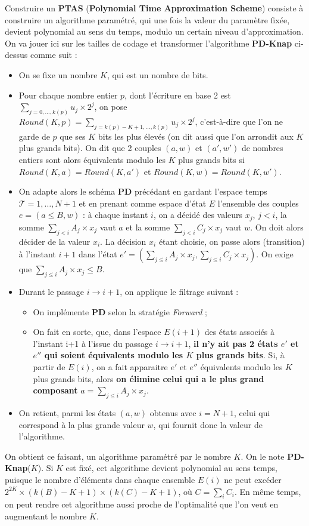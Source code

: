 Construire un \textbf{PTAS} (\textbf{Polynomial Time Approximation Scheme}) consiste à construire un algorithme paramétré, qui une fois la valeur du paramètre fixée, devient polynomial au sens du temps, modulo un certain niveau d'approximation. On va jouer ici sur les tailles de codage et transformer l'algorithme \textbf{PD-Knap} ci-dessus comme suit :

\begin{itemize}[label=$\square$]
	\item	On se fixe un nombre $K$, qui est un nombre de bits.
	\item	Pour chaque nombre entier $p$, dont l'écriture en base 2 est $\sum_{j = 0,\dots,k(p)} u_j\times 2^j$, on pose $Round(K, p) = \sum_{j = k(p) - K+1 ,\dots,k(p)} u_j \times 2^j$,  c'est-à-dire que l'on ne garde de $p$ que ses $K$ bits les plus élevés (on dit aussi que l'on arrondit aux $K$ plus grands bits). On dit que 2 couples $(a, w)$ et $(a', w')$ de nombres entiers sont alors équivalents modulo les $K$ plus grands bits si $Round(K, a) = Round(K, a')$ et $Round(K, w) = Round(K, w')$.
	\item	On adapte alors le schéma \textbf{PD} précédant en gardant l'espace temps $\mathcal{T} = {1, \dots, N+1}$ et en prenant comme espace d'état $E$ l'ensemble des couples $e = (a \leq B, w)$ : à chaque instant $i$, on a décidé des valeurs $x_j$, $j < i$, la somme $\sum_{j < i } A_j\times x_j$ vaut $a$ et la somme $\sum_{j < i} C_j\times x_j$ vaut $w$.  On doit alors décider de la valeur $x_i$. La décision $x_i$ étant choisie, on passe alors (transition) à l'instant $i+1$ dans l'état $e' = (\sum_{j \leq i} A_j \times x_j, \sum_{j \leq i} C_j\times x_j)$. On exige que $\sum_{j \leq i} A_j\times x_j \leq B$.
	\item	Durant le passage $i \rightarrow i+1$, on applique le filtrage suivant : 
	\begin{itemize}
		\item	On implémente \textbf{PD} selon la stratégie \textit{Forward} ;
		\item	On fait en sorte, que, dans l'espace $E(i+1)$ des états associés à l'instant i+1 à l'issue du passage $i \rightarrow i+1$, \textbf{il n'y ait pas 2 états $e'$ et $e''$ qui soient équivalents modulo les $K$ plus grands bits}.  Si, à partir de $E(i)$,  on a fait apparaitre $e'$ et $e''$ équivalents modulo les $K$ plus grands bits, alors \textbf{on élimine celui qui a le plus grand composant} $a = \sum_{j \leq i} A_j \times x_j$. 
	\end{itemize}
	\item	On retient, parmi les états $(a, w)$ obtenus avec $i = N+1$, celui qui correspond à la plus grande valeur $w$, qui fournit donc la valeur de l'algorithme.
\end{itemize}
On obtient ce faisant, un algorithme paramétré par le nombre $K$. On le note \textbf{PD-Knap}($K$). Si $K$ est fixé, cet algorithme devient polynomial au sens temps, puisque le nombre d'éléments dans chaque ensemble $E(i)$ ne peut excéder $2^{2K} \times (k(B) - K +1)\times (k(C) - K +1)$, où $C = \sum_i C_i$.  En même temps, on peut rendre cet algorithme aussi proche de l'optimalité que l'on veut en augmentant le nombre $K$.

